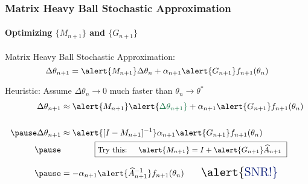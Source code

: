 \documentclass[xcolor=dvipsnames, subsection=false]{beamer}
\def\alertc#1{\alert{\color{MyDarkBlue}  #1}}
\def\alertg#1{\alert{\color{darkspringgreen}  #1}}
\def\haA{\widehat A}
\def\alertc#1{\alert{\color{MyDarkBlue}  #1}}
\begin{document}
\begin{frame}
\frametitle{Matrix Heavy Ball Stochastic Approximation}
\framesubtitle{Optimizing $\{M_{n+1}\}$ and $\{G_{n+1}\}$}


\alertc{Matrix Heavy Ball Stochastic Approximation:} 
\[
\Delta \theta_{n+1}  =  \alert{M_{n+1}}  \Delta \theta_{n} +  \alpha_{n+1} \alert{ G_{n+1} } f_{n+1}(\theta_{n})
\]

\alertg{Heuristic:}  Assume $\Delta \theta_n \to 0$ much faster than $\theta_n \to \theta^*$
\pause
\vspace{1em} 
\[
\begin{aligned}
\Delta \theta_{n+1}  & \approx \alert{M_{n+1}}   \alertg{\Delta\theta_{n+1}}  +  \alpha_{n+1} \alert{ G_{n+1} } f_{n+1}(\theta_{n})
\\
\\
\pause
\Delta \theta_{n+1} & \approx \alert{[I - M_{n+1}]^{-1}} \alpha_{n+1} \alert{ G_{n+1}} f_{n+1}(\theta_{n})
\\
\pause
& 
\qquad 
\qquad 
\framebox{\small Try this:  \quad  $  \alert{M_{n+1}  } = I +  \alert{G_{n+1}}    \haA_{n+1}$  }
\\[.75em]
\pause
& = - \alpha_{n+1}  \alert{\haA_{n+1}^{-1}}  f_{n+1}(\theta_{n}) \qquad
\text{\Large \alertc{SNR!}}
\end{aligned}
\]

\vspace{0.5em}
\end{frame}
\end{document}
